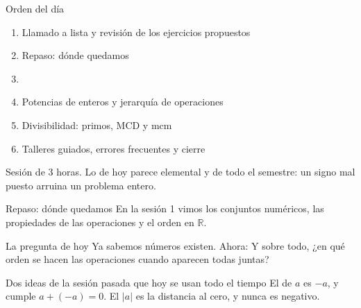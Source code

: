 \documentclass[aspectratio=169,10pt]{beamer}
\begin{document}
\portada

\begin{frame}{Orden del día}
  \begin{enumerate}
    \item Llamado a lista y revisión de los ejercicios propuestos
    \item Repaso: dónde quedamos
    \item {}
    \item Potencias de enteros y jerarquía de operaciones
    \item Divisibilidad: primos, MCD y mcm
    \item Talleres guiados, errores frecuentes y cierre
  \end{enumerate}

  \vspace{0.25cm}
  {\footnotesize\color{uniGris} Sesión de 3 horas. Lo de hoy parece elemental y
   de todo el semestre:
  un signo mal puesto arruina un problema entero.}
\end{frame}

\begin{frame}{Repaso: dónde quedamos}
  \footnotesize
  En la sesión 1 vimos los conjuntos numéricos, las propiedades de las
  operaciones y el orden en $\mathbb{R}$.

  \vspace{0.2cm}
  \begin{alertblock}{La pregunta de hoy}
    \footnotesize
    Ya sabemos  números existen. Ahora:  Y sobre todo, ¿en qué
    orden se hacen las operaciones cuando aparecen todas juntas?
  \end{alertblock}

  \vspace{0.2cm}
  \begin{block}{Dos ideas de la sesión pasada que hoy se usan todo el tiempo}
    \footnotesize
    El  de $a$ es $-a$, y cumple $a + (-a) = 0$. \quad
    El  $|a|$ es la distancia al cero, y nunca es
    negativo.
  \end{block}
\end{frame}

\end{document}
